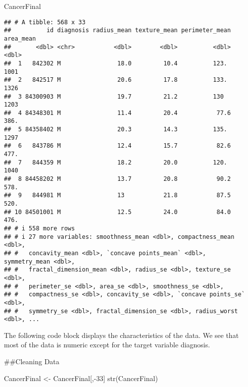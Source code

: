 \documentclass[
]{article}
\newenvironment{Shaded}{\begin{snugshade}}{\end{snugshade}}
\newcommand{\DecValTok}[1]{\textcolor[rgb]{0.00,0.00,0.81}{#1}}
\newcommand{\FunctionTok}[1]{\textcolor[rgb]{0.00,0.00,0.00}{#1}}
\newcommand{\NormalTok}[1]{#1}
\newcommand{\OtherTok}[1]{\textcolor[rgb]{0.56,0.35,0.01}{#1}}
\newcommand{\SpecialCharTok}[1]{\textcolor[rgb]{0.00,0.00,0.00}{#1}}
\begin{document}
\begin{Shaded}
\begin{Highlighting}[]
\NormalTok{CancerFinal}
\end{Highlighting}
\end{Shaded}

\begin{verbatim}
## # A tibble: 568 x 33
##          id diagnosis radius_mean texture_mean perimeter_mean area_mean
##       <dbl> <chr>           <dbl>        <dbl>          <dbl>     <dbl>
##  1   842302 M                18.0         10.4          123.      1001 
##  2   842517 M                20.6         17.8          133.      1326 
##  3 84300903 M                19.7         21.2          130       1203 
##  4 84348301 M                11.4         20.4           77.6      386.
##  5 84358402 M                20.3         14.3          135.      1297 
##  6   843786 M                12.4         15.7           82.6      477.
##  7   844359 M                18.2         20.0          120.      1040 
##  8 84458202 M                13.7         20.8           90.2      578.
##  9   844981 M                13           21.8           87.5      520.
## 10 84501001 M                12.5         24.0           84.0      476.
## # i 558 more rows
## # i 27 more variables: smoothness_mean <dbl>, compactness_mean <dbl>,
## #   concavity_mean <dbl>, `concave points_mean` <dbl>, symmetry_mean <dbl>,
## #   fractal_dimension_mean <dbl>, radius_se <dbl>, texture_se <dbl>,
## #   perimeter_se <dbl>, area_se <dbl>, smoothness_se <dbl>,
## #   compactness_se <dbl>, concavity_se <dbl>, `concave points_se` <dbl>,
## #   symmetry_se <dbl>, fractal_dimension_se <dbl>, radius_worst <dbl>, ...
\end{verbatim}

The following code block displays the characteristics of the data. We
see that most of the data is numeric except for the target variable
diagnosis.

\#\#Cleaning Data

\begin{Shaded}
\begin{Highlighting}[]
\NormalTok{CancerFinal }\OtherTok{\textless{}{-}}\NormalTok{ CancerFinal[,}\SpecialCharTok{{-}}\DecValTok{33}\NormalTok{]}
\FunctionTok{str}\NormalTok{(CancerFinal)}
\end{Highlighting}
\end{Shaded}
\end{document}
